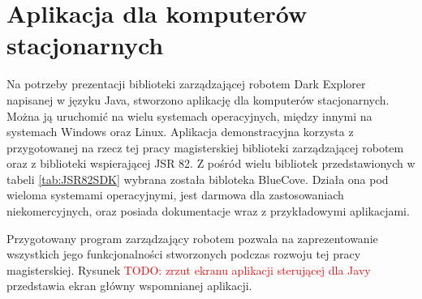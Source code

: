 \section{Aplikacja dla komputerów stacjonarnych}
Na potrzeby prezentacji biblioteki zarządzającej robotem Dark Explorer napisanej w języku Java, stworzono aplikację dla komputerów stacjonarnych. Można ją uruchomić na wielu systemach operacyjnych, między innymi na systemach Windows oraz Linux. Aplikacja demonstracyjna korzysta z przygotowanej na rzecz tej pracy magisterskiej biblioteki zarządzającej robotem oraz z biblioteki wspierającej JSR 82. Z pośród wielu bibliotek przedstawionych w tabeli \ref{tab:JSR82SDK} wybrana została bibloteka BlueCove\cite{website:bluecove.org}. Działa ona pod wieloma systemami operacyjnymi, jest darmowa dla zastosowaniach niekomercyjnych, oraz posiada dokumentacje wraz z przykładowymi aplikacjami. 

Przygotowany program zarządzający robotem pozwala na zaprezentowanie wszystkich jego funkcjonalności stworzonych podczas rozwoju tej pracy magisterskiej. Rysunek \textcolor{red}{TODO: zrzut ekranu aplikacji sterującej dla Javy} przedstawia ekran główny wspomnianej aplikacji. 
